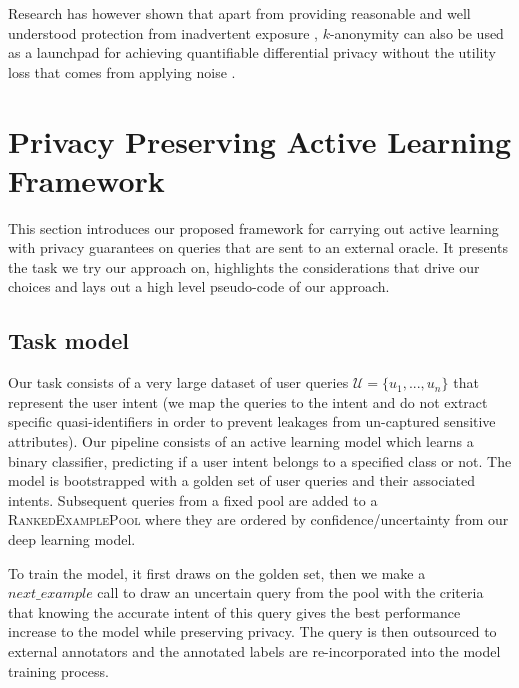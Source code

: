 \documentclass[letterpaper]{article}
\begin{document}
Research has however shown that apart from providing reasonable and well understood protection from inadvertent exposure \cite{di2016enforcing},  $k$-anonymity can also be used as a launchpad for achieving quantifiable differential privacy without the utility loss that comes from applying noise \cite{li2012sampling,soria2014enhancing}. 



\section{Privacy Preserving Active Learning Framework}
This section introduces our proposed framework for carrying out active learning with privacy guarantees on queries that are sent to an external oracle. It presents the task we try our approach on, highlights the considerations that drive our choices and lays out a high level pseudo-code of our approach.
%
%

\subsection{Task model}
Our task consists of a very large dataset of user queries $\mathcal{U} = \{u_1,...,u_n\}$ that represent the user intent (we map the queries to the intent and do not extract specific quasi-identifiers in order to prevent leakages from un-captured sensitive attributes). Our pipeline consists of an active learning model which learns a binary classifier, predicting if a user intent belongs to a specified class or not. The model is bootstrapped with a golden set of user queries and their associated intents. Subsequent queries from a fixed pool are added to a \textsc{RankedExamplePool} where they are ordered by confidence/uncertainty \cite{gal2016dropout} from our deep learning model. 

To train the model, it first draws on the golden set, then we make a $next\_example$ call to draw an uncertain query from the pool with the criteria that knowing the accurate intent of this query gives the best performance increase to the model while preserving privacy. The query is then outsourced to external annotators and the annotated labels are re-incorporated into the model training process.
\end{document}
